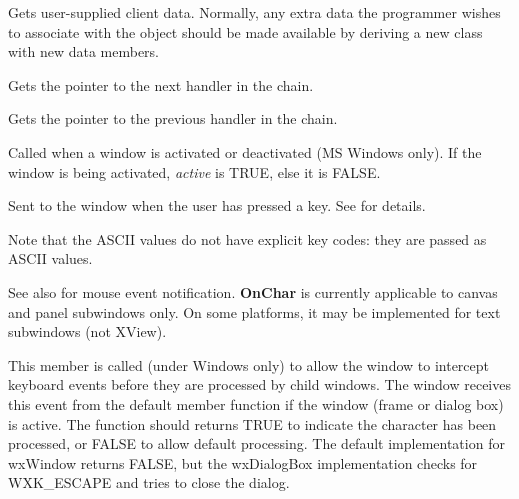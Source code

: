 

Gets user-supplied client data.  Normally, any extra data the programmer wishes
to associate with the object should be made available by deriving a new class
with new data members.



Gets the pointer to the next handler in the chain.



Gets the pointer to the previous handler in the chain.



Called when a window is activated or deactivated (MS Windows
only). If the window is being activated, {\it active} is TRUE, else it
is FALSE.

\label{wxevthandleronchar}


Sent to the window when the user has pressed a key. See  for
details.

Note that the ASCII values do not have explicit key codes: they are passed as ASCII
values.

See also  for mouse event notification. {\bf OnChar} is
currently applicable to canvas and panel subwindows only. On some platforms, it may
be implemented for text subwindows (not XView).

\label{wxevthandleroncharhook}


This member is called (under Windows only) to allow the window to intercept keyboard events
before they are processed by child windows. The window receives this event from
the default  member function if the window
(frame or dialog box) is active. The function should returns TRUE to indicate the
character has been processed, or FALSE to allow default processing. The default
implementation for wxWindow returns FALSE, but the wxDialogBox implementation
checks for WXK\_ESCAPE and tries to close the dialog.

